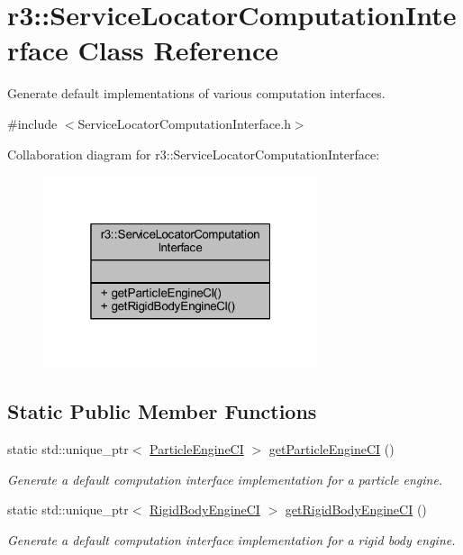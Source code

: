 \hypertarget{classr3_1_1_service_locator_computation_interface}{}\section{r3\+:\+:Service\+Locator\+Computation\+Interface Class Reference}
\label{classr3_1_1_service_locator_computation_interface}


Generate default implementations of various computation interfaces.  




{\ttfamily \#include $<$Service\+Locator\+Computation\+Interface.\+h$>$}



Collaboration diagram for r3\+:\+:Service\+Locator\+Computation\+Interface\+:\nopagebreak
\begin{figure}[H]
\begin{center}
\leavevmode
\includegraphics[width=229pt]{classr3_1_1_service_locator_computation_interface__coll__graph}
\end{center}
\end{figure}
\subsection*{Static Public Member Functions}
\begin{DoxyCompactItemize}
\item 
static std\+::unique\+\_\+ptr$<$ \mbox{\hyperlink{classr3_1_1_particle_engine_c_i}{Particle\+Engine\+CI}} $>$ \mbox{\hyperlink{classr3_1_1_service_locator_computation_interface_abc0c31a51308c4db9932763325c0cb08}{get\+Particle\+Engine\+CI}} ()
\begin{DoxyCompactList}\small\item\em Generate a default computation interface implementation for a particle engine. \end{DoxyCompactList}\item 
static std\+::unique\+\_\+ptr$<$ \mbox{\hyperlink{classr3_1_1_rigid_body_engine_c_i}{Rigid\+Body\+Engine\+CI}} $>$ \mbox{\hyperlink{classr3_1_1_service_locator_computation_interface_a01d7434be386277d9a9a26d6859472c3}{get\+Rigid\+Body\+Engine\+CI}} ()
\begin{DoxyCompactList}\small\item\em Generate a default computation interface implementation for a rigid body engine. \end{DoxyCompactList}\end{DoxyCompactItemize}


